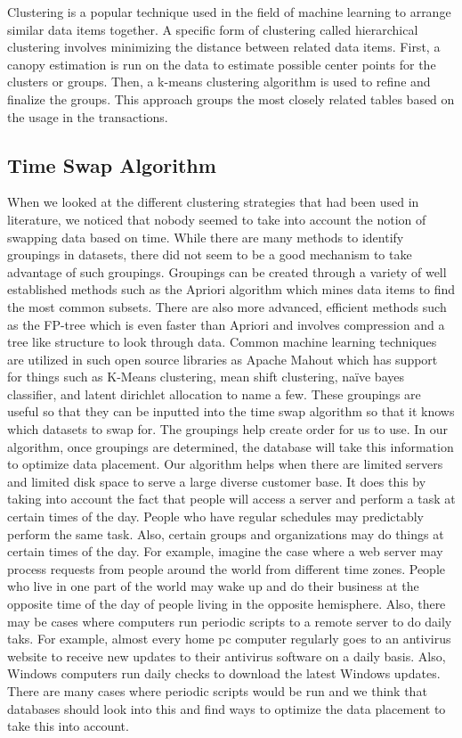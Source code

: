\documentclass[10pt,final,journal]{IEEEtran}
\begin{document}
Clustering is a popular technique used in the field of machine learning to arrange similar data items together.  A specific form of clustering called hierarchical clustering involves minimizing the distance between related data items.  First, a canopy estimation is run on the data to estimate possible center points for the clusters or groups.  Then, a k-means clustering algorithm is used to refine and finalize the groups.  This approach groups the most closely related tables based on the usage in the transactions.

\subsection {Time Swap Algorithm}
When we looked at the different clustering strategies that had been used in literature, we noticed that nobody seemed to take into account the notion of swapping data based on time. While there are many methods to identify groupings in datasets, there did not seem to be a good mechanism to take advantage of such groupings. Groupings can be created through a variety of well established methods such as the Apriori algorithm which mines data items to find the most common subsets. There are also more advanced, efficient methods such as the FP-tree which is even faster than Apriori and involves compression and a tree like structure to look through data. Common machine learning techniques are utilized in such open source libraries as Apache Mahout which has support for things such as K-Means clustering, mean shift clustering, naïve bayes classifier, and latent dirichlet allocation to name a few. These groupings are useful so that they can be inputted into the time swap algorithm so that it knows which datasets to swap for. The groupings help create order for us to use. In our algorithm, once groupings are determined, the database will take this information to optimize data placement. Our algorithm helps when there are limited servers and limited disk space to serve a large diverse customer base. It does this by taking into account the fact that people will access a server and perform a task at certain times of the day. People who have regular schedules may predictably perform the same task. Also, certain groups and organizations may do things at certain times of the day. For example, imagine the case where a web server may process requests from people around the world from different time zones. People who live in one part of the world may wake up and do their business at the opposite time of the day of people living in the opposite hemisphere. Also, there may be cases where computers run periodic scripts to a remote server to do daily taks.  For example, almost every home pc computer regularly goes to an antivirus website to receive new updates to their antivirus software on a daily basis.  Also, Windows computers run daily checks to download the latest Windows updates. There are many cases where periodic scripts would be run and we think that databases should look into this and find ways to optimize the data placement to take this into account. 
\end{document}
